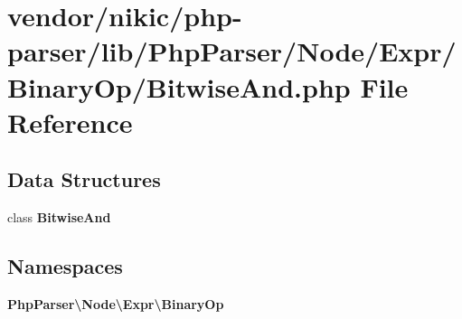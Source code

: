\section{vendor/nikic/php-\/parser/lib/\+Php\+Parser/\+Node/\+Expr/\+Binary\+Op/\+Bitwise\+And.php File Reference}
\label{_binary_op_2_bitwise_and_8php}
\subsection*{Data Structures}
\begin{DoxyCompactItemize}
\item 
class {\bf Bitwise\+And}
\end{DoxyCompactItemize}
\subsection*{Namespaces}
\begin{DoxyCompactItemize}
\item 
 {\bf Php\+Parser\textbackslash{}\+Node\textbackslash{}\+Expr\textbackslash{}\+Binary\+Op}
\end{DoxyCompactItemize}
